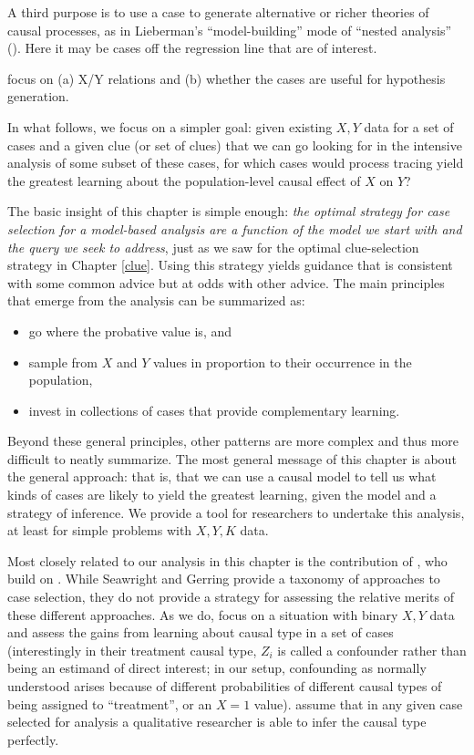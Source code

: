 \documentclass[
  12pt,
]{book}
\providecommand{\tightlist}{%
  \setlength{\itemsep}{0pt}\setlength{\parskip}{0pt}}
\begin{document}
A third purpose is to use a case to generate alternative or richer theories of causal processes, as in Lieberman's ``model-building'' mode of ``nested analysis'' (\citet{Lieberman2005nested}). Here it may be cases off the regression line that are of interest.

\citet{weller2014finding} focus on (a) X/Y relations and (b) whether the cases are useful for hypothesis generation.

In what follows, we focus on a simpler goal: given existing \(X, Y\) data for a set of cases and a given clue (or set of clues) that we can go looking for in the intensive analysis of some subset of these cases, for which cases would process tracing yield the greatest learning about the population-level causal effect of \(X\) on \(Y\)?

The basic insight of this chapter is simple enough: \emph{the optimal strategy for case selection for a model-based analysis are a function of the model we start with and the query we seek to address}, just as we saw for the optimal clue-selection strategy in Chapter \ref{clue}. Using this strategy yields guidance that is consistent with some common advice but at odds with other advice. The main principles that emerge from the analysis can be summarized as:

\begin{itemize}
\tightlist
\item
  go where the probative value is, and
\item
  sample from \(X\) and \(Y\) values in proportion to their occurrence in the population,
\item
  invest in collections of cases that provide complementary learning.
\end{itemize}

Beyond these general principles, other patterns are more complex and thus more difficult to neatly summarize. The most general message of this chapter is about the general approach: that is, that we can use a causal model to tell us what kinds of cases are likely to yield the greatest learning, given the model and a strategy of inference. We provide a tool for researchers to undertake this analysis, at least for simple problems with \(X, Y, K\) data.

Most closely related to our analysis in this chapter is the contribution of \citet{HerronQuinn}, who build on \citet{SeawrightGerring2008}. While Seawright and Gerring provide a taxonomy of approaches to case selection, they do not provide a strategy for assessing the relative merits of these different approaches. As we do, \citet{HerronQuinn} focus on a situation with binary \(X,Y\) data and assess the gains from learning about causal type in a set of cases (interestingly in their treatment causal type, \(Z_i\) is called a confounder rather than being an estimand of direct interest; in our setup, confounding as normally understood arises because of different probabilities of different causal types of being assigned to ``treatment'', or an \(X=1\) value). \citet{HerronQuinn} assume that in any given case selected for analysis a qualitative researcher is able to infer the causal type perfectly.
\end{document}
